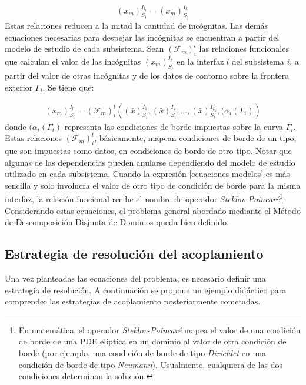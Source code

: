 \begin{equation}
{(x_m)_{S_i}^{I_{l_1}}}={(x_m)_{S_j}^{I_{l_2}}}
\label{continuidad}
\end{equation}
Estas relaciones reducen a la mitad la cantidad de incógnitas.
Las demás ecuaciones necesarias para despejar las incógnitas se encuentran a partir del modelo de estudio de cada subsistema. 
Sean $(\mathscr{F}_m)_{i}^{l}$ las relaciones funcionales que calculan el valor de las incógnitas ${(x_m)_{S_i}^{I_l}}$ en la interfaz $l$ del subsistema $i$,
a partir del valor de otras incógnitas y de los datos de contorno sobre la frontera exterior $\Gamma_i$.
Se tiene que:

\begin{equation}
\begin{split}
  (x_m)_{S_i}^{I_l} = (\mathscr{F}_m)_{i}^{l} \left ( (\bar{x})_{S_i}^{I_1}, (\bar{x})_{S_i}^{I_2}, ..., 
  (\bar{x})_{S_i}^{I_{L_i}}, (\alpha_i({\Gamma_i}) \right )
\end{split}
\label{ecuaciones-modelos}
\end{equation}
donde $(\alpha_i({\Gamma_i})$ representa las condiciones de borde impuestas sobre la curva $\Gamma_i$.
Estas relaciones $(\mathscr{F}_m)_{i}^{l}$, básicamente, mapean condiciones de borde de un tipo, que son impuestas como datos, en condiciones de borde de otro tipo.
Notar que algunas de las dependencias pueden anularse dependiendo del modelo de estudio utilizado en cada subsistema.
Cuando la expresión \ref{ecuaciones-modelos} es más sencilla y solo involucra el valor de otro tipo de condición de borde para la misma interfaz,
la relación funcional recibe el nombre de operador \textit{Steklov-Poincaré}\footnote{
En matemática, el operador \textit{Steklov-Poincaré} mapea el valor de una condición de borde de una PDE elíptica en un dominio al valor
de otra condición de borde (por ejemplo, una condición de borde de tipo \textit{Dirichlet} en una condición de borde de tipo \textit{Neumann}).
Usualmente, cualquiera de las dos condiciones determinan la solución.
}.
Considerando estas ecuaciones, el problema general abordado mediante el Método de Descomposición Disjunta de Dominios queda bien definido.

\subsection*{Estrategia de resolución del acoplamiento}
\label{1:ecuaciones}
Una vez planteadas las ecuaciones del problema, es necesario definir una estrategia de resolución.
A continuación se propone un ejemplo didáctico para comprender las estrategias de acoplamiento posteriormente cometadas.

